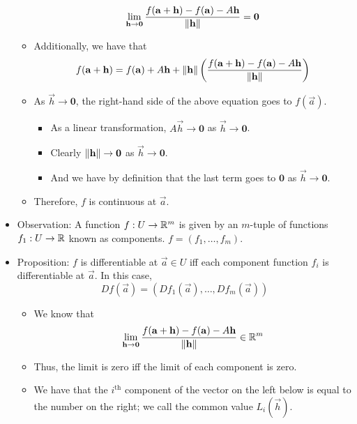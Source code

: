 \documentclass[../notes.tex]{subfiles}
\begin{document}
\begin{itemize}
\begin{itemize}
        \begin{equation*}
            \lim_{\mathbf{h}\to\bm{0}}\frac{f(\mathbf{a}+\mathbf{h})-f(\mathbf{a})-A\mathbf{h}}{\norm{\mathbf{h}}} = \bm{0}
        \end{equation*}
        \item Additionally, we have that
        \begin{equation*}
            f(\mathbf{a}+\mathbf{h}) = f(\mathbf{a})+A\mathbf{h}+\norm{\mathbf{h}}\left( \frac{f(\mathbf{a}+\mathbf{h})-f(\mathbf{a})-A\mathbf{h}}{\norm{\mathbf{h}}} \right)
        \end{equation*}
        \item As $\vec{h}\to\bm{0}$, the right-hand side of the above equation goes to $f(\vec{a})$.
        \begin{itemize}
            \item As a linear transformation, $A\vec{h}\to\bm{0}$ as $\vec{h}\to\bm{0}$.
            \item Clearly $\norm{\mathbf{h}}\to\bm{0}$ as $\vec{h}\to\bm{0}$.
            \item And we have by definition that the last term goes to $\bm{0}$ as $\vec{h}\to\bm{0}$.
        \end{itemize}
        \item Therefore, $f$ is continuous at $\vec{a}$.
    \end{itemize}
    \item Observation: A function $f:U\to\mathbb{R}^m$ is given by an $m$-tuple of functions $f_1:U\to\mathbb{R}$ known as components. $f=(f_1,\dots,f_m)$.
    \item Proposition: $f$ is differentiable at $\vec{a}\in U$ iff each component function $f_i$ is differentiable at $\vec{a}$. In this case,
    \begin{equation*}
        Df(\vec{a}) = (Df_1(\vec{a}),\dots,Df_m(\vec{a}))
    \end{equation*}
    \begin{itemize}
        \item We know that
        \begin{equation*}
            \lim_{\mathbf{h}\to\bm{0}}\frac{f(\mathbf{a}+\mathbf{h})-f(\mathbf{a})-A\mathbf{h}}{\norm{\mathbf{h}}} \in \mathbb{R}^m
        \end{equation*}
        \item Thus, the limit is zero iff the limit of each component is zero.
        \item We have that the $i^\text{th}$ component of the vector on the left below is equal to the number on the right; we call the common value $L_i(\vec{h})$.

\end{itemize}
\end{itemize}
\end{document}
